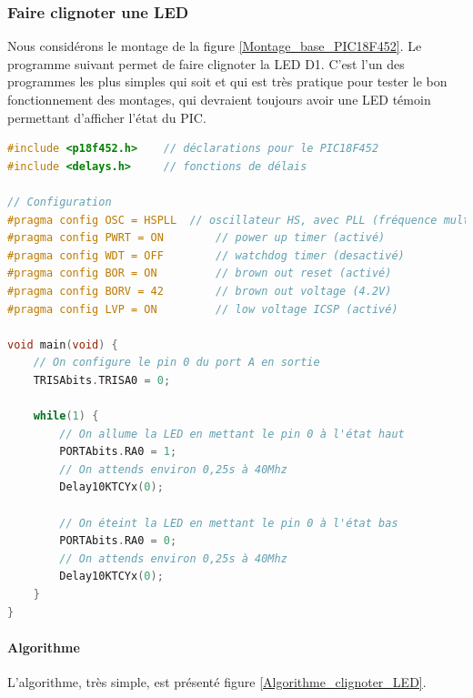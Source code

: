 \documentclass[a4paper]{article}
\begin{document}
\subsubsection{Faire clignoter une LED}

Nous considérons le montage de la figure \ref{Montage_base_PIC18F452}. Le programme suivant permet de faire clignoter la \ac{LED} D1. C'est l'un des programmes les plus simples qui soit et qui est très pratique pour tester le bon fonctionnement des montages, qui devraient toujours avoir une \ac{LED} témoin permettant d'afficher l'état du PIC.

\begin{lstlisting}[caption=Programme faisant clignoter une \ac{LED}, label=Programme_faisant_clignoter_une_LED, language=c]
#include <p18f452.h>	// déclarations pour le PIC18F452
#include <delays.h>		// fonctions de délais

// Configuration
#pragma config OSC = HSPLL	// oscillateur HS, avec PLL (fréquence multipliée par 4)
#pragma config PWRT = ON		// power up timer (activé)
#pragma config WDT = OFF		// watchdog timer (desactivé)
#pragma config BOR = ON			// brown out reset (activé)
#pragma config BORV = 42		// brown out voltage (4.2V)
#pragma config LVP = ON			// low voltage ICSP (activé)

void main(void) {
	// On configure le pin 0 du port A en sortie
	TRISAbits.TRISA0 = 0;

	while(1) {
		// On allume la LED en mettant le pin 0 à l'état haut
		PORTAbits.RA0 = 1;
		// On attends environ 0,25s à 40Mhz
		Delay10KTCYx(0);

		// On éteint la LED en mettant le pin 0 à l'état bas
		PORTAbits.RA0 = 0;
		// On attends environ 0,25s à 40Mhz
		Delay10KTCYx(0);
	}
}
\end{lstlisting}

\paragraph{Algorithme}

L'algorithme, très simple, est présenté figure \ref{Algorithme_clignoter_LED}.
\end{document}
